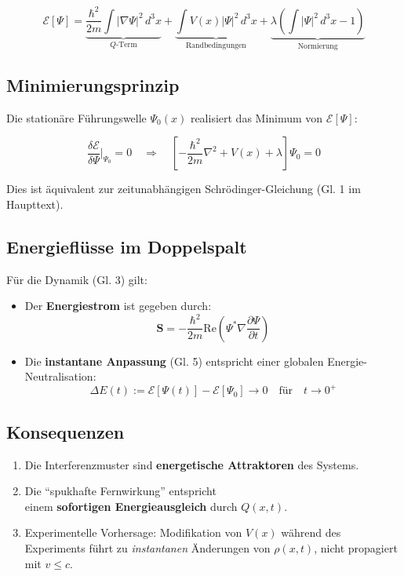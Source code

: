 \documentclass[12pt]{article}
\begin{document}
\begin{equation}
\mathcal{E}[\Psi] = \underbrace{\frac{\hbar^2}{2m} \int |\nabla \Psi|^2 \, d^3x}_{Q\text{-Term}} + \underbrace{\int V(x) |\Psi|^2 \, d^3x}_{\text{Randbedingungen}} + \underbrace{\lambda \left( \int |\Psi|^2 \, d^3x - 1 \right)}_{\text{Normierung}}
\end{equation}

\subsection{Minimierungsprinzip}
Die stationäre Führungswelle $\Psi_0(x)$ realisiert das Minimum von $\mathcal{E}[\Psi]$:

\begin{equation}
\frac{\delta \mathcal{E}}{\delta \Psi} \bigg|_{\Psi_0} = 0 \quad \Rightarrow \quad \left[ -\frac{\hbar^2}{2m} \nabla^2 + V(x) + \lambda \right] \Psi_0 = 0
\end{equation}

Dies ist äquivalent zur zeitunabhängigen Schrödinger-Gleichung (Gl. 1 im Haupttext).

\subsection{Energieflüsse im Doppelspalt}
Für die Dynamik (Gl. 3) gilt:

\begin{itemize}
\item Der \textbf{Energiestrom} ist gegeben durch:
\begin{equation}
\mathbf{S} = -\frac{\hbar^2}{2m} \mathrm{Re} \left( \Psi^* \nabla \frac{\partial \Psi}{\partial t} \right)
\end{equation}

\item Die \textbf{instantane Anpassung} (Gl. 5) entspricht einer globalen Energie-Neutralisation:
\begin{equation}
\Delta E(t) := \mathcal{E}[\Psi(t)] - \mathcal{E}[\Psi_0] \to 0 \quad \text{für} \quad t \to 0^+
\end{equation}
\end{itemize}

\subsection{Konsequenzen}
\begin{enumerate}
\item Die Interferenzmuster sind \textbf{energetische Attraktoren} des Systems.
\item Die \enquote{spukhafte Fernwirkung} entspricht\\einem \textbf{sofortigen Energieausgleich} durch $Q(x,t)$.
\item Experimentelle Vorhersage: Modifikation von $V(x)$ während des Experiments führt zu \textit{instantanen} Änderungen von $\rho(x,t)$, nicht propagiert mit $v \leq c$.
\end{enumerate}
\end{document}
